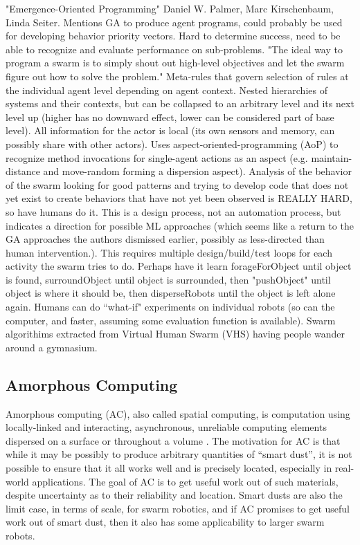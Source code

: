 \documentclass[]{article}
\begin{document}
"Emergence-Oriented Programming" \cite{palmer2005emergence} Daniel W. Palmer, Marc Kirschenbaum, Linda Seiter. Mentions GA to produce agent programs, could probably be used for developing behavior priority vectors. Hard to determine success, need to be able to recognize and evaluate performance on sub-problems. "The ideal way to program a swarm is to simply shout out high-level objectives and let the swarm figure out how to solve the problem." Meta-rules that govern selection of rules at the individual agent level depending on agent context. Nested hierarchies of systems and their contexts, but can be collapsed to an arbitrary level and its next level up (higher has no downward effect, lower can be considered part of base level). All information for the actor is local (its own sensors and memory, can possibly share with other actors). Uses aspect-oriented-programming (AoP) to recognize method invocations for single-agent actions as an aspect (e.g. maintain-distance and move-random forming a dispersion aspect). Analysis of the behavior of the swarm looking for good patterns and trying to develop code that does not yet exist to create behaviors that have not yet been observed is REALLY HARD, so have humans do it. This is a design process, not an automation process, but indicates a direction for possible ML approaches (which seems like a return to the GA approaches the authors dismissed earlier, possibly as less-directed than human intervention.). This requires multiple design/build/test loops for each activity the swarm tries to do. Perhaps have it learn forageForObject until object is found, surroundObject until object is surrounded, then "pushObject" until object is where it should be, then disperseRobots until the object is left alone again. Humans can do ``what-if" experiments on individual robots (so can the computer, and faster, assuming some evaluation function is available). Swarm algorithims extracted from Virtual Human Swarm (VHS) having people wander around a gymnasium. 

\subsection{Amorphous Computing}

Amorphous computing (AC), also called spatial computing, is computation using locally-linked and interacting, asynchronous, unreliable computing elements dispersed on a surface or throughout a volume \cite{abelson2000amorphous}. 
The motivation for AC is that while it may be possibly to produce arbitrary quantities of ``smart dust'', it is not possible to ensure that it all works well and is precisely located, especially in real-world applications.
The goal of AC is to get useful work out of such materials, despite uncertainty as to their reliability and location. 
Smart dusts are also the limit case, in terms of scale, for swarm robotics, and if AC promises to get useful work out of smart dust, then it also has some applicability to larger swarm robots.
\end{document}
